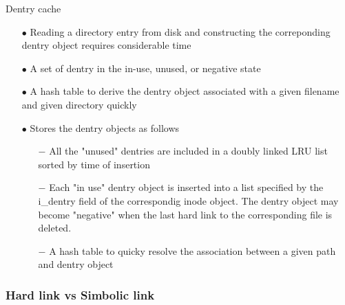\documentclass{beamer}
\begin{document}
\begin{frame}{Dentry cache}
	\begin{itemize}[<+->]
		\item[$\bullet$]{Reading a directory entry from disk and constructing the correponding dentry object requires considerable time}
		\item[$\bullet$]{A set of dentry in the in-use, unused, or negative state}
		\item[$\bullet$]{A hash table to derive the dentry object associated with a given filename and  given directory quickly}
		\item[$\bullet$]{Stores the dentry objects as follows}
			\begin{itemize}
				\item[$-$]{All the "unused" dentries are included in a doubly linked LRU list sorted by time of insertion}
				\item[$-$]{Each "in use" dentry object is inserted into a list specified by the i\_dentry field of the correspondig inode object. The dentry object may become "negative" when the last hard link to the corresponding file is deleted.}
				\item[$-$]{A hash table to quicky resolve the association between a given path and dentry object}
			\end{itemize}
	\end{itemize}
\end{frame}

\subsubsection{Hard link vs Simbolic link}
\end{document}
